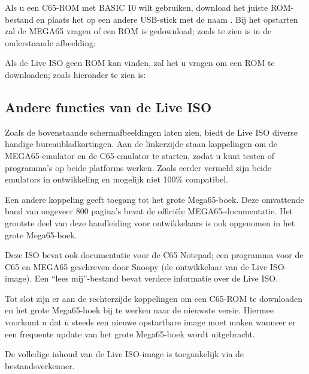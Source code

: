 
Als u een C65-ROM met BASIC 10 wilt gebruiken, download het juiste ROM-bestand en plaats het op een andere USB-stick met de naam . Bij het opstarten zal de MEGA65 vragen of een ROM is gedownload; zoals te zien is in de onderstaande afbeelding:


Als de Live ISO geen ROM kan vinden, zal het u vragen om een ROM te downloaden; zoals hieronder te zien is:


\subsection{Andere functies van de Live ISO}

Zoals de bovenstaande schermafbeeldingen laten zien, biedt de Live ISO diverse handige bureaubladkortingen. Aan de linkerzijde staan koppelingen om de
MEGA65-emulator en de C65-emulator te starten, zodat u kunt testen of programma's
op beide platforms werken. Zoals eerder vermeld zijn beide emulators in ontwikkeling en mogelijk niet 100\% compatibel.

Een andere koppeling geeft toegang tot het grote Mega65-boek. Deze omvattende band van
ongeveer 800 pagina's bevat de officiële MEGA65-documentatie. Het grootste deel van deze handleiding voor ontwikkelaars is ook opgenomen in het grote Mega65-boek.

Deze ISO bevat ook documentatie voor de C65 Notepad; een programma voor de C65 en MEGA65 geschreven door Snoopy (de ontwikkelaar van de Live ISO-image). Een ``lees mij''-bestand bevat verdere informatie over de Live ISO.

Tot slot zijn er aan de rechterzijde koppelingen om een C65-ROM te downloaden en het grote Mega65-boek bij te werken naar de nieuwste versie. Hiermee voorkomt u dat u steeds een nieuwe opstartbare image moet maken wanneer er een frequente update van het grote Mega65-boek wordt uitgebracht.

De volledige inhoud van de Live ISO-image is toegankelijk via de bestandsverkenner.

